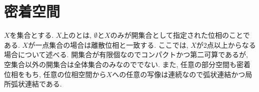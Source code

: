 \documentclass[uplatex, dvipdfmx, a4paper, 12pt, class=jsbook, crop=false]{standalone}
\begin{document}
\section{密着空間}
\label{ex:indiscrete-space}

$ X $を集合とする.
$ X $上のとは,
$ \emptyset $と$ X $のみが開集合として指定された位相のことである.
$ X $が一点集合の場合は離散位相と一致する.
ここでは, $ X $が2点以上からなる場合について述べる.
開集合が有限個なのでコンパクトかつ第二可算であるが,
空集合以外の開集合は全体集合のみなのででない.
また, 任意の部分空間も密着位相をもち, 任意の位相空間から$ X $への任意の写像は連続なので弧状連結かつ局所弧状連結である.
\end{document}
